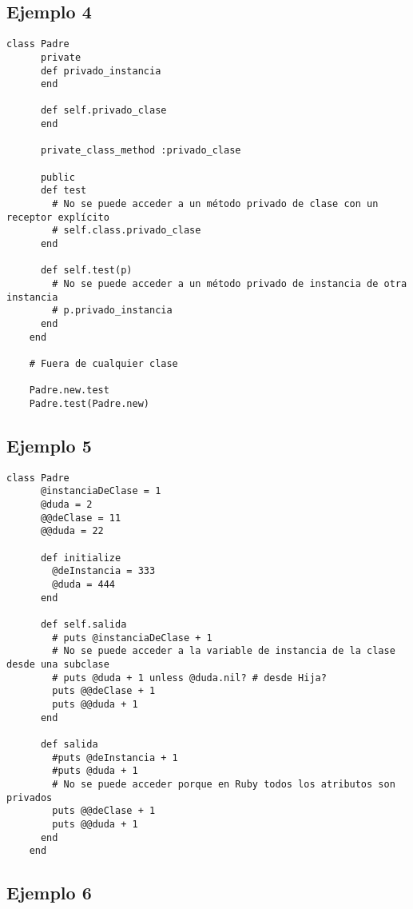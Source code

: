 \documentclass[a4paper,12pt]{article}
\begin{document}
\subsection{Ejemplo 4}

\begin{lstlisting}[style=customruby]
    class Padre
      private
      def privado_instancia
      end
    
      def self.privado_clase
      end
    
      private_class_method :privado_clase
    
      public
      def test
        # No se puede acceder a un método privado de clase con un receptor explícito
        # self.class.privado_clase
      end
    
      def self.test(p)
        # No se puede acceder a un método privado de instancia de otra instancia
        # p.privado_instancia
      end
    end
    
    # Fuera de cualquier clase
    
    Padre.new.test
    Padre.test(Padre.new)
    \end{lstlisting}

\subsection{Ejemplo 5}

\begin{lstlisting}[style=customruby]
    class Padre
      @instanciaDeClase = 1
      @duda = 2
      @@deClase = 11
      @@duda = 22
    
      def initialize
        @deInstancia = 333
        @duda = 444
      end
    
      def self.salida
        # puts @instanciaDeClase + 1
        # No se puede acceder a la variable de instancia de la clase desde una subclase
        # puts @duda + 1 unless @duda.nil? # desde Hija?
        puts @@deClase + 1
        puts @@duda + 1
      end
    
      def salida
        #puts @deInstancia + 1
        #puts @duda + 1
        # No se puede acceder porque en Ruby todos los atributos son privados
        puts @@deClase + 1
        puts @@duda + 1
      end
    end
\end{lstlisting}

\subsection{Ejemplo 6}
\end{document}
